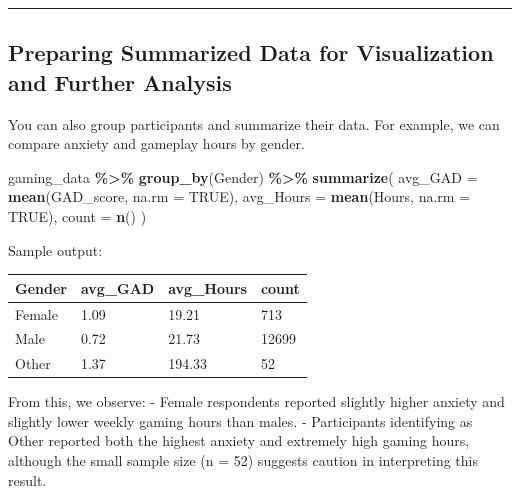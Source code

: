 \documentclass[
]{book}
\newenvironment{Shaded}{\begin{snugshade}}{\end{snugshade}}
\newcommand{\AttributeTok}[1]{\textcolor[rgb]{0.13,0.29,0.53}{#1}}
\newcommand{\ConstantTok}[1]{\textcolor[rgb]{0.56,0.35,0.01}{#1}}
\newcommand{\FunctionTok}[1]{\textcolor[rgb]{0.13,0.29,0.53}{\textbf{#1}}}
\newcommand{\NormalTok}[1]{#1}
\newcommand{\SpecialCharTok}[1]{\textcolor[rgb]{0.81,0.36,0.00}{\textbf{#1}}}
\begin{document}
\begin{center}\rule{0.5\linewidth}{0.5pt}\end{center}

\subsection*{\texorpdfstring{\textbf{Preparing Summarized Data for Visualization and Further Analysis}}{Preparing Summarized Data for Visualization and Further Analysis}}\label{preparing-summarized-data-for-visualization-and-further-analysis}

You can also group participants and summarize their data. For example, we can compare anxiety and gameplay hours by gender.

\begin{Shaded}
\begin{Highlighting}[]
\NormalTok{gaming\_data }\SpecialCharTok{\%\textgreater{}\%}
  \FunctionTok{group\_by}\NormalTok{(Gender) }\SpecialCharTok{\%\textgreater{}\%}
  \FunctionTok{summarize}\NormalTok{(}
    \AttributeTok{avg\_GAD =} \FunctionTok{mean}\NormalTok{(GAD\_score, }\AttributeTok{na.rm =} \ConstantTok{TRUE}\NormalTok{),}
    \AttributeTok{avg\_Hours =} \FunctionTok{mean}\NormalTok{(Hours, }\AttributeTok{na.rm =} \ConstantTok{TRUE}\NormalTok{),}
    \AttributeTok{count =} \FunctionTok{n}\NormalTok{()}
\NormalTok{  )}
\end{Highlighting}
\end{Shaded}

Sample output:

\begin{longtable}[]{@{}llll@{}}
\toprule\noalign{}
Gender & avg\_GAD & avg\_Hours & count \\
\midrule\noalign{}
\endhead
\bottomrule\noalign{}
\endlastfoot
Female & 1.09 & 19.21 & 713 \\
Male & 0.72 & 21.73 & 12699 \\
Other & 1.37 & 194.33 & 52 \\
\end{longtable}

From this, we observe: - Female respondents reported slightly higher anxiety and slightly lower weekly gaming hours than males. - Participants identifying as Other reported both the highest anxiety and extremely high gaming hours, although the small sample size (n = 52) suggests caution in interpreting this result.
\end{document}
